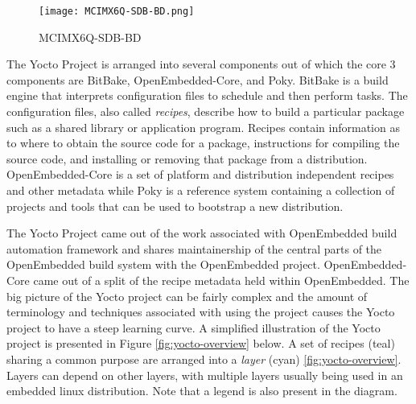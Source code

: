 \begin{figure}[h]
	\centering
	\texttt{[image: MCIMX6Q-SDB-BD.png]}
	\caption{MCIMX6Q-SDB-BD}
	\label{fig:mcimx6q-sdb}
\end{figure}

The Yocto Project is arranged into several components out of which the core 3 components are BitBake, OpenEmbedded-Core, and Poky. BitBake is a build engine that interprets configuration files to schedule and then perform tasks. The configuration files, also called  \textit{recipes}, describe how to build a particular package such as a shared library or application program. Recipes contain information as to where to obtain the source code for a package, instructions for compiling the source code, and installing or removing that package from a distribution. OpenEmbedded-Core is a set of platform and distribution independent recipes and other metadata while Poky is a reference system containing a collection of projects and tools that can be used to bootstrap a new distribution.

The Yocto Project came out of the work associated with OpenEmbedded build automation framework and shares maintainership of the central parts of the OpenEmbedded build system with the OpenEmbedded project. OpenEmbedded-Core came out of a split of the recipe metadata held within OpenEmbedded. The big picture of the Yocto project can be fairly complex and the amount of terminology and techniques associated with using the project causes the Yocto project to have a steep learning curve. A simplified illustration of the Yocto project is presented in Figure \ref{fig:yocto-overview} below. A set of recipes (teal) sharing a common purpose are arranged into a \textit{layer} (cyan) \ref{fig:yocto-overview}. Layers can depend on other layers, with multiple layers usually being used in an embedded linux distribution. Note that a legend is also present in the diagram.

